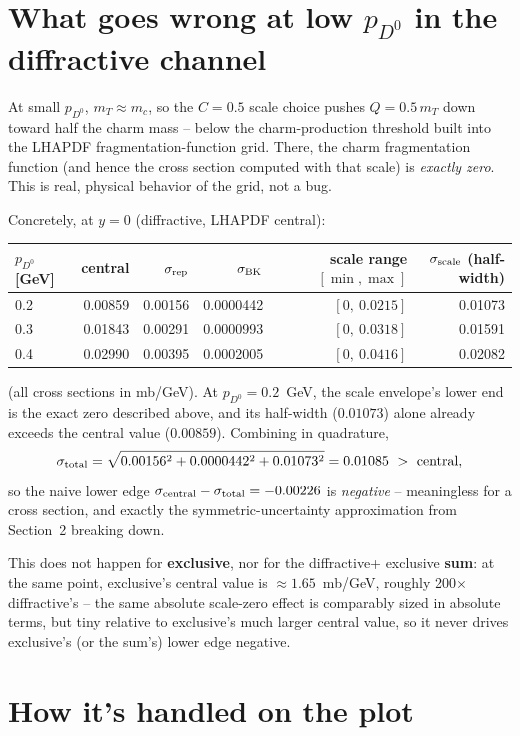 \documentclass[11pt]{article}
\begin{document}
\section{What goes wrong at low $p_{D^0}$ in the diffractive channel}

At small $p_{D^0}$, $m_T\approx m_c$, so the $C=0.5$ scale choice pushes
$Q=0.5\,m_T$ down toward half the charm mass -- below the charm-production
threshold built into the LHAPDF fragmentation-function grid. There, the
charm fragmentation function (and hence the cross section computed with
that scale) is \emph{exactly zero}. This is real, physical behavior of the
grid, not a bug.

Concretely, at $y=0$ (diffractive, LHAPDF central):

\begin{center}
\begin{tabular}{lrrrrr}
\toprule
$p_{D^0}$ [GeV] & central & $\sigma_{\rm rep}$ & $\sigma_{\rm BK}$ &
scale range $[\min,\max]$ & $\sigma_{\rm scale}$ (half-width) \\
\midrule
0.2 & 0.00859 & 0.00156 & 0.0000442 & $[0,\ 0.0215]$ & 0.01073 \\
0.3 & 0.01843 & 0.00291 & 0.0000993 & $[0,\ 0.0318]$ & 0.01591 \\
0.4 & 0.02990 & 0.00395 & 0.0002005 & $[0,\ 0.0416]$ & 0.02082 \\
\bottomrule
\end{tabular}
\end{center}

(all cross sections in mb/GeV). At $p_{D^0}=0.2$~GeV, the scale envelope's
lower end is the exact zero described above, and its half-width
($0.01073$) alone already exceeds the central value ($0.00859$). Combining
in quadrature,
\[
\sigma_{\rm total}=\sqrt{0.00156^2+0.0000442^2+0.01073^2}=0.01085 \ >\ \text{central},
\]
so the naive lower edge $\sigma_{\rm central}-\sigma_{\rm total}=-0.00226$
is \emph{negative} -- meaningless for a cross section, and exactly the
symmetric-uncertainty approximation from Section~2 breaking down.

This does not happen for \textbf{exclusive}, nor for the diffractive+
exclusive \textbf{sum}: at the same point, exclusive's central value is
$\approx\!1.65$~mb/GeV, roughly 200$\times$ diffractive's -- the same
absolute scale-zero effect is comparably sized in absolute terms, but tiny
relative to exclusive's much larger central value, so it never drives
exclusive's (or the sum's) lower edge negative.

\section{How it's handled on the plot}
\end{document}
